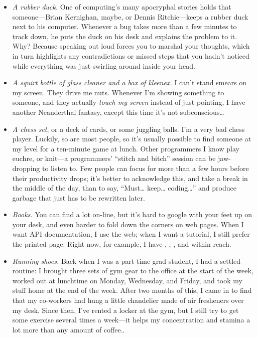 \documentclass{report}
\begin{document}
\begin{itemize}
  \item \emph{A rubber duck.} One of computing's many apocryphal
  stories holds that someone---Brian Kernighan, maybe, or Dennis
  Ritchie---keeps a rubber duck next to his computer.  Whenever a bug
  takes more than a few minutes to track down, he puts the duck on his
  desk and explains the problem to it.  Why?  Because speaking out
  loud forces you to marshal your thoughts, which in turn highlights
  any contradictions or missed steps that you hadn't noticed while
  everything was just swirling around inside your head.

  \item \emph{A squirt bottle of glass cleaner and a box of kleenex.}
  I can't stand smears on my screen.  They drive me nuts.  Whenever
  I'm showing something to someone, and they actually \emph{touch my
  screen} instead of just pointing, I have another Neanderthal
  fantasy, except this time it's not subconscious{\ldots}

  \item \emph{A chess set}, or a deck of cards, or some juggling
  balls.  I'm a very bad chess player.  Luckily, so are most people,
  so it's usually possible to find someone at my level for a
  ten-minute game at lunch.  Other programmers I know play euchre, or
  knit---a programmers' ``stitch and bitch'' session can be
  jaw-dropping to listen to.  Few people can focus for more than a few
  hours before their productivity drops; it's better to acknowledge
  this, and take a break in the middle of the day, than to say,
  ``Must{\ldots} keep{\ldots} coding{\ldots}'' and produce garbage
  that just has to be rewritten later.

  \item \emph{Books.} You can find a lot on-line, but it's hard to
  google with your feet up on your desk, and even harder to fold down
  the corners on web pages.  When I want API documentation, I use the
  web; when I want a tutorial, I still prefer the printed page.  Right
  now, for example, I have \cite{b:berkun-art-proj-mgmt},
  \cite{b:doar-practical-dev-env},
  \cite{b:fogel-producing-open-source}, and
  \cite{b:ely-marmot-understanding-offices} within reach.

  \item \emph{Running shoes.} Back when I was a part-time grad
  student, I had a settled routine: I brought three sets of gym gear
  to the office at the start of the week, worked out at lunchtime on
  Monday, Wednesday, and Friday, and took my stuff home at the end of
  the week.  After two months of this, I came in to find that my
  co-workers had hung a little chandelier made of air fresheners over
  my desk.  Since then, I've rented a locker at the gym, but I still
  try to get some exercise several times a week---it helps my
  concentration and stamina a lot more than any amount of coffee..


\end{itemize}
\end{document}

